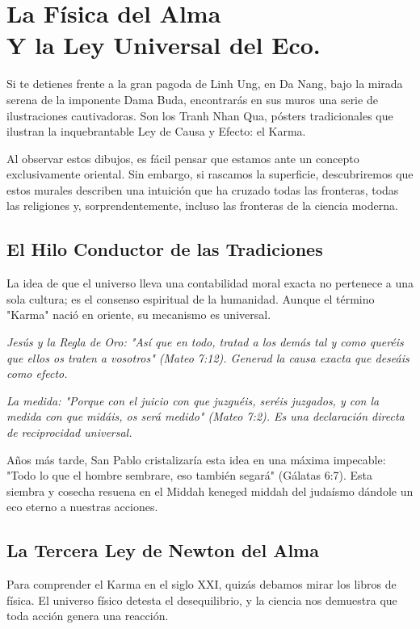 \chapter[La Física del Alma]{La Física del Alma\\ \large Y la Ley Universal del Eco.}


\lettrine[lines=3, nindent=0.5em, findent=0.2em]{S}{}i te detienes frente a la gran pagoda de Linh Ung, en Da Nang, bajo la mirada serena de la imponente Dama Buda, encontrarás en sus muros una serie de ilustraciones cautivadoras. Son los Tranh Nhan Qua, pósters tradicionales que ilustran la inquebrantable Ley de Causa y Efecto: el Karma.

Al observar estos dibujos, es fácil pensar que estamos ante un concepto exclusivamente oriental. Sin embargo, si rascamos la superficie, descubriremos que estos murales describen una intuición que ha cruzado todas las fronteras, todas las religiones y, sorprendentemente, incluso las fronteras de la ciencia moderna.

\section{El Hilo Conductor de las Tradiciones}
La idea de que el universo lleva una contabilidad moral exacta no pertenece a una sola cultura; es el consenso espiritual de la humanidad. Aunque el término "Karma" nació en oriente, su mecanismo es universal.

\textit{Jesús y la Regla de Oro: "Así que en todo, tratad a los demás tal y como queréis que ellos os traten a vosotros" (Mateo 7:12). Generad la causa exacta que deseáis como efecto.}


\textit{La medida: "Porque con el juicio con que juzguéis, seréis juzgados, y con la medida con que midáis, os será medido" (Mateo 7:2). Es una declaración directa de reciprocidad universal.}

Años más tarde, San Pablo cristalizaría esta idea en una máxima impecable: "Todo lo que el hombre sembrare, eso también segará" (Gálatas 6:7). Esta siembra y cosecha resuena en el Middah keneged middah del judaísmo dándole un eco eterno a nuestras acciones.

\section{La Tercera Ley de Newton del Alma}
Para comprender el Karma en el siglo XXI, quizás debamos mirar los libros de física. El universo físico detesta el desequilibrio, y la ciencia nos demuestra que toda acción genera una reacción.

